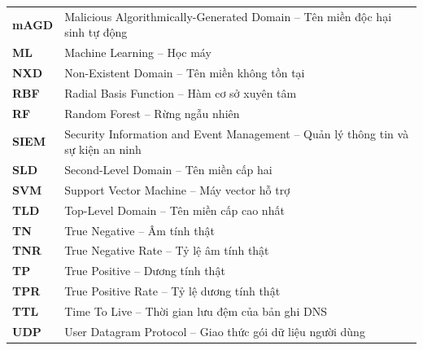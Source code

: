 \begin{longtable}{p{2.6cm} p{12.4cm}}
\textbf{mAGD} & Malicious Algorithmically-Generated Domain -- Tên miền độc hại sinh tự động \\
\textbf{ML} & Machine Learning -- Học máy \\
\textbf{NXD} & Non-Existent Domain -- Tên miền không tồn tại \\
\textbf{RBF} & Radial Basis Function -- Hàm cơ sở xuyên tâm \\
\textbf{RF} & Random Forest -- Rừng ngẫu nhiên \\
\textbf{SIEM} & Security Information and Event Management -- Quản lý thông tin và sự kiện an ninh \\
\textbf{SLD} & Second-Level Domain -- Tên miền cấp hai \\
\textbf{SVM} & Support Vector Machine -- Máy vector hỗ trợ \\
\textbf{TLD} & Top-Level Domain -- Tên miền cấp cao nhất \\
\textbf{TN} & True Negative -- Âm tính thật \\
\textbf{TNR} & True Negative Rate -- Tỷ lệ âm tính thật \\
\textbf{TP} & True Positive -- Dương tính thật \\
\textbf{TPR} & True Positive Rate -- Tỷ lệ dương tính thật \\
\textbf{TTL} & Time To Live -- Thời gian lưu đệm của bản ghi DNS \\
\textbf{UDP} & User Datagram Protocol -- Giao thức gói dữ liệu người dùng \\
\end{longtable}

